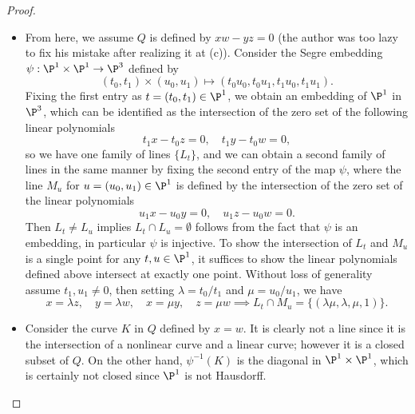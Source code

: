 \documentclass[a4paper]{article}
\begin{document}
\begin{enumerate} [label=\textbf{\arabic*.}, leftmargin=0cm]
\begin{proof}
\begin{itemize} [leftmargin=0cm]
                  \item[(b)] From here, we assume $Q$ is defined by $xw - yz = 0$ (the author was too lazy to fix his mistake after realizing it at (c)). Consider the Segre embedding $\psi : \P^1 \times \P^1 \to \P^3$ defined by
                        \begin{equation*}
                            (t_0, t_1) \times (u_0, u_1) \mapsto (t_0 u_0, t_0 u_1, t_1 u_0, t_1 u_1).
                        \end{equation*}
                        Fixing the first entry as $t = (t_0, t_1) \in \P^1$, we obtain an embedding of $\P^1$ in $\P^3$, which can be identified as the intersection of the zero set of the following linear polynomials
                        \begin{equation*}
                            t_1 x - t_0 z = 0, \quad t_1 y - t_0 w = 0,
                        \end{equation*}
                        so we have one family of lines $\{ L_t \}$, and we can obtain a second family of lines in the same manner by fixing the second entry of the map $\psi$, where the line $M_u$ for $u = (u_0, u_1) \in \P^1$ is defined by the intersection of the zero set of the linear polynomials
                        \begin{equation*}
                            u_1 x - u_0 y = 0, \quad u_1 z - u_0 w = 0.
                        \end{equation*}
                        Then $L_t \neq L_u$ implies $L_t \cap L_u = \emptyset$ follows from the fact that $\psi$ is an embedding, in particular $\psi$ is injective. To show the intersection of $L_t$ and $M_u$ is a single point for any $t, u \in \P^1$, it suffices to show the linear polynomials defined above intersect at exactly one point. Without loss of generality assume $t_1, u_1 \neq 0$, then setting $\lambda = t_0 / t_1$ and $\mu = u_0 / u_1$, we have
                        \begin{equation*}
                            x = \lambda z, \quad y = \lambda w, \quad x = \mu y, \quad z = \mu w \implies L_t \cap M_u = \{ (\lambda \mu, \lambda, \mu, 1) \}.
                        \end{equation*}

                  \item[(c)] Consider the curve $K$ in $Q$ defined by $x = w$. It is clearly not a line since it is the intersection of a nonlinear curve and a linear curve; however it is a closed subset of $Q$. On the other hand, $\psi^{-1}(K)$ is the diagonal in $\P^1 \times \P^1$, which is certainly not closed since $\P^1$ is not Hausdorff.
              \end{itemize}
          \end{proof}

\end{enumerate}
\end{document}
